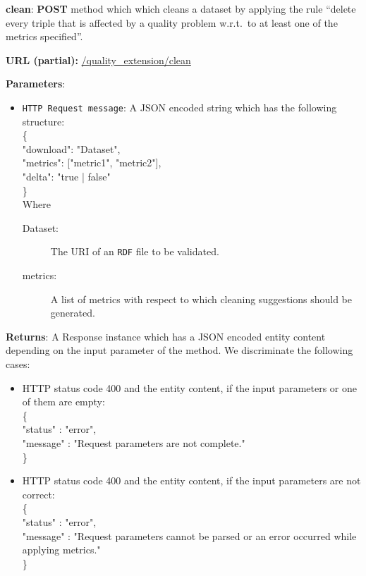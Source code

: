 \begin{description}
\item{\textbf{clean}:} \textbf{POST} method which which cleans a dataset by applying the rule ``delete every triple that is affected by a quality problem w.r.t.\ to at least one of the metrics specified''.

\textbf{URL (partial):} \url{/quality_extension/clean} 

\textbf{Parameters}: 
\begin{itemize}
\item \texttt{HTTP Request message}: A JSON encoded string which has the following structure: \\
\{ \\
\hspace*{0.5 cm}"download": "Dataset", \\
\hspace*{0.5 cm}"metrics": ["metric1", "metric2"], \\
\hspace*{0.5 cm}"delta": "true | false" \\  
\} \\

Where 
\begin{description}
\item[Dataset:] The URI of an \texttt{RDF} file to be validated. 
\item[metrics:] A list of metrics with respect to which cleaning suggestions should be generated.
\end{description}

\end{itemize}
\textbf{Returns}: A Response instance which has a JSON encoded entity content depending on the input parameter of the method. We discriminate the following cases: 
\begin{itemize}
\item  HTTP status code 400 and the entity content, if the input parameters or one of them are empty:\\ \hspace*{0.2 cm}\{\\
\hspace*{0.5 cm} "status" : "error",\\
\hspace*{0.5 cm} "message" : "Request parameters are not complete."\\ \hspace*{0.2 cm} \} 

\item HTTP status code 400 and the entity content, if the input parameters are not correct:\\ \hspace*{0.2 cm} \{ \\
\hspace*{0.5 cm} "status" : "error",\\
\hspace*{0.5 cm}  "message" : "Request parameters cannot be parsed or an error occurred while applying metrics."\\ \hspace*{0.2 cm} \}


\end{itemize}
\end{description}
